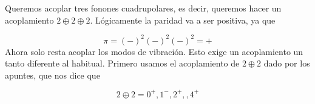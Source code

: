     Queremos acoplar tres fonones cuadrupolares, es decir, queremos hacer un acoplamiento $2\oplus 2\oplus 2$. Lógicamente la paridad va a ser positiva, ya que

    \begin{equation}
        \pi = (-)^2 (-)^2 (-)^2 = +
    \end{equation}
    Ahora solo resta acoplar los modos de vibración. Esto exige un acoplamiento un tanto diferente al habitual. Primero usamos el acoplamiento de $2\oplus 2$ dado por los apuntes, que nos dice que

    \begin{equation*}
        2 \oplus 2 = 0^+,1^-,2^+,,4^+
    \end{equation*}

